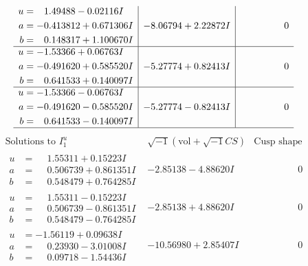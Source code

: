\documentclass[1p]{elsarticle_modified}
\theoremstyle{definition}
\newcommand{\I}{\sqrt{-1}}
\begin{document}
$$\begin{array}{c|c|c}
\begin{aligned}
u &= \phantom{-}1.49488 - 0.02116 I \\
a &= -0.413812 + 0.671306 I \\
b &= \phantom{-}0.148317 + 1.100670 I\end{aligned}
 & -8.06794 + 2.22872 I & \phantom{-0.000000 } 0 \\ \hline\begin{aligned}
u &= -1.53366 + 0.06763 I \\
a &= -0.491620 + 0.585520 I \\
b &= \phantom{-}0.641533 + 0.140097 I\end{aligned}
 & -5.27774 + 0.82413 I & \phantom{-0.000000 } 0 \\ \hline\begin{aligned}
u &= -1.53366 - 0.06763 I \\
a &= -0.491620 - 0.585520 I \\
b &= \phantom{-}0.641533 - 0.140097 I\end{aligned}
 & -5.27774 - 0.82413 I & \phantom{-0.000000 } 0\\
 \hline 
 \end{array}$$\newpage$$\begin{array}{c|c|c}  
\text{Solutions to }I^u_{1}& \I (\text{vol} + \sqrt{-1}CS) & \text{Cusp shape}\\
 \hline 
\begin{aligned}
u &= \phantom{-}1.55311 + 0.15223 I \\
a &= \phantom{-}0.506739 + 0.861351 I \\
b &= \phantom{-}0.548479 + 0.764285 I\end{aligned}
 & -2.85138 - 4.88620 I & \phantom{-0.000000 } 0 \\ \hline\begin{aligned}
u &= \phantom{-}1.55311 - 0.15223 I \\
a &= \phantom{-}0.506739 - 0.861351 I \\
b &= \phantom{-}0.548479 - 0.764285 I\end{aligned}
 & -2.85138 + 4.88620 I & \phantom{-0.000000 } 0 \\ \hline\begin{aligned}
u &= -1.56119 + 0.09638 I \\
a &= \phantom{-}0.23930 - 3.01008 I \\
b &= \phantom{-}0.09718 - 1.54436 I\end{aligned}
 & -10.56980 + 2.85407 I & \phantom{-0.000000 } 0 \\ \hline\begin{aligned}

\end{aligned}
\end{array}$$
\end{document}
